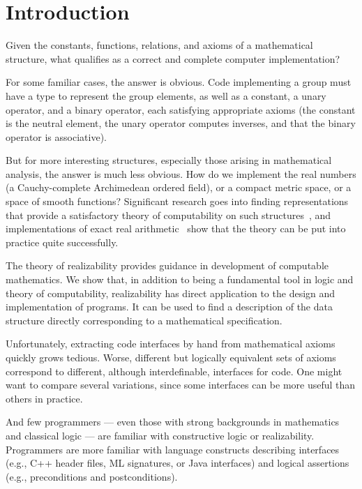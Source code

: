 \section{Introduction}
\label{sec:introduction}

Given the constants, functions, relations, and axioms of a mathematical
structure, what qualifies as a correct and complete computer implementation?

For some familiar cases, the answer is obvious. Code implementing a group must
have a type to represent the group elements, as well as a constant, a unary
operator, and a binary operator, each satisfying appropriate axioms (the
constant is the neutral element, the unary operator computes inverses, and that
the binary operator is associative).

But for more interesting structures, especially those arising in
mathematical analysis, the answer is much less obvious. How do we
implement the real numbers (a Cauchy-complete Archimedean ordered
field), or a compact metric space, or a space of smooth functions?
Significant research goes into finding representations that provide a
satisfactory theory of computability on such
structures~\cite{Wei00,TZ98,Bla97,EL00}, and implementations of exact
real arithmetic~\cite{Mue00,Lam05a} show that the theory can be put
into practice quite successfully.

The theory of realizability provides guidance in development of
computable mathematics.   We show that, in addition to being a
fundamental tool in logic and theory of computability, realizability
has direct application to the design and implementation of programs.
It can be used to find a description of the data structure directly
corresponding to a mathematical specification.

Unfortunately, extracting code interfaces by hand from mathematical axioms
quickly grows tedious. Worse, different but logically equivalent sets of axioms
correspond to different, although interdefinable, interfaces for code. One
might want to compare several variations, since some interfaces can be more
useful than others in practice.

And few programmers --- even those with strong backgrounds in
mathematics and classical logic --- are familiar with constructive logic or
realizability. Programmers are more familiar with language constructs
describing interfaces (e.g., C++ header files, ML signatures, or Java
interfaces) and logical assertions (e.g., preconditions
and postconditions).


